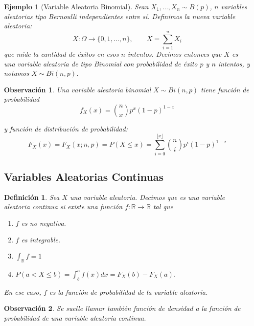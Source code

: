 \documentclass{report}
\newtheorem{dfn}{Definición}[section]
\newtheorem{obs}{Observación}[section]
\newtheorem{ej}{Ejemplo}[section]
\begin{document}
\begin{ej}[Variable Aleatoria Binomial]
    Sean $X_1,\ldots, X_n\sim B(p)$, $n$ variables aleatorias tipo Bernoulli independientes entre sí. Definimos la nueva variable aleatoria:
    \begin{equation*}
        X:\Omega \rightarrow \{0,1,\ldots, n\}, \qquad X=\sum_{i=1}^n X_i
    \end{equation*}
    que mide la cantidad de éxitos en esos $n$ intentos.
    Decimos entonces que $X$ es una variable aleatoria de tipo Binomial con probabilidad de éxito $p$ y $n$ intentos, y notamos $X\sim Bi(n,p)$.
\end{ej}

\begin{obs}
    Una variable aleatoria binomial $X\sim Bi(n,p)$ tiene función de probabilidad
    \begin{equation*}
        f_X(x) = {n\choose x} p^x(1-p)^{1-x}
    \end{equation*}

    y función de distribución de probabilidad:
    \begin{equation*}
        F_X(x) = F_X(x; n,p) = P(X\leq x) = \sum_{i=0}^{\lfloor x \rfloor}  {n\choose i} p^i(1-p)^{1-i}
    \end{equation*}
\end{obs}

\subsection{Variables Aleatorias Continuas}

\begin{dfn}
    Sea $X$ una variable aleatoria. Decimos que es una \emph{variable aleatoria continua} si existe una función $f:\mathbb{R}\rightarrow\mathbb{R}$ tal que
    \begin{enumerate}
        \item $f$ es no negativa.
        \item $f$ es integrable.
        \item $\int_{\mathbb{R}}f = 1$
        \item $P(a<X\leq b) = \int_{b}^{a} f(x)dx = F_X(b)-F_X(a)$.
    \end{enumerate}
    En ese caso, $f$ es la función de probabilidad de la variable aleatoria.
\end{dfn}

\begin{obs}
    Se suelle llamar también \emph{función de densidad} a la función de probabilidad de una variable aleatoria continua.
\end{obs}
\end{document}
